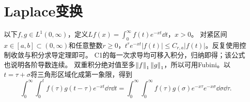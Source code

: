 \section{Laplace变换}
以下$f,g\in L^1(0,\infty)$，定义$Lf(x)=\int_0^\infty f(t)e^{-xt}\dd t$，$x>0$。
对紧区间$x\in[a,b]\subset(0,\infty)$和任意整数$r\ge0$，$t^re^{-xt}|f(t)|\le C_{r,a}|f(t)|$。反复使用控制收敛与积分求导定理即可。
C1的每一次求导均可移入积分，归纳即得；该公式也说明各阶导数连续。
双重积分绝对值至多$\left\lVert f\right\rVert_1\left\lVert g\right\rVert_1$，所以可用Fubini。以$t=\tau+\sigma$将三角形区域化成第一象限，得到
\[\int_0^\infty\int_0^t f(\tau)g(t-\tau)e^{-xt}\dd\tau\dd t=\int_0^\infty\int_0^\infty f(\tau)g(\sigma)e^{-x\tau}e^{-x\sigma}\dd\sigma\dd\tau.\]
